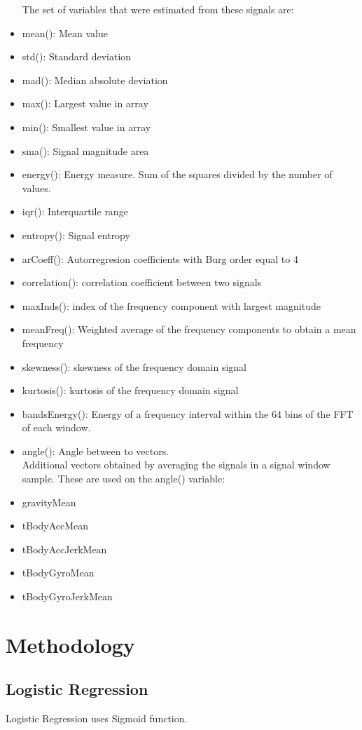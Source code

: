 \documentclass[12pt,a4paper]{report}
\begin{document}
\begin{itemize}
	The set of variables that were estimated from these signals are: \\
	\item mean(): Mean value
	\item std(): Standard deviation
	\item mad(): Median absolute deviation 
	\item max(): Largest value in array
	\item min(): Smallest value in array
	\item sma(): Signal magnitude area
	\item energy(): Energy measure. Sum of the squares divided by the number of values. 
	\item iqr(): Interquartile range 
	\item entropy(): Signal entropy
	\item arCoeff(): Autorregresion coefficients with Burg order equal to 4
	\item correlation(): correlation coefficient between two signals
	\item maxInds(): index of the frequency component with largest magnitude
	\item meanFreq(): Weighted average of the frequency components to obtain a mean frequency
	\item skewness(): skewness of the frequency domain signal 
	\item kurtosis(): kurtosis of the frequency domain signal
	\item bandsEnergy(): Energy of a frequency interval within the 64 bins of the FFT of each window.
	\item angle(): Angle between to vectors.
	\\
	
	Additional vectors obtained by averaging the signals in a signal window sample. These are used on the angle() variable:
	\item gravityMean
	\item tBodyAccMean
	\item tBodyAccJerkMean
	\item tBodyGyroMean
	\item tBodyGyroJerkMean  

\end{itemize}		
\newpage
\section{Methodology}
\subsection{Logistic Regression}
Logistic Regression uses Sigmoid function.
\end{document}

